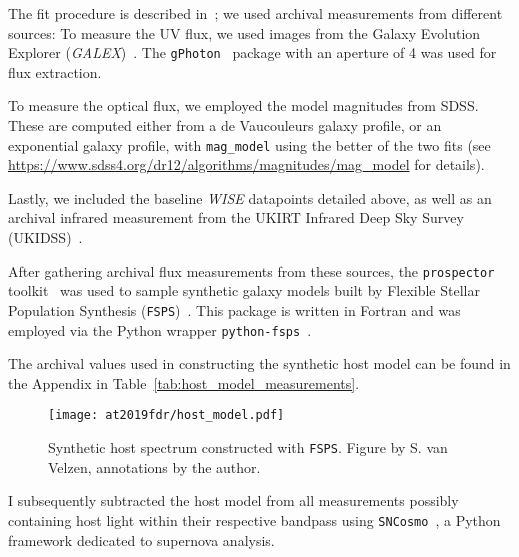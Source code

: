 The fit procedure is described in~; we used archival measurements from different sources: To measure the UV flux, we used images from the Galaxy Evolution Explorer (\textit{GALEX})~. The \texttt{gPhoton}~ package with an aperture of \SI{4}{\arcsec} was used for flux extraction.

To measure the optical flux, we employed the model magnitudes from SDSS. These are computed either from a de Vaucouleurs galaxy profile, or an exponential galaxy profile, with \texttt{mag\_model} using the better of the two fits (see \url{https://www.sdss4.org/dr12/algorithms/magnitudes/mag_model} for details).

Lastly, we included the baseline \textit{WISE} datapoints detailed above, as well as an archival infrared measurement from the UKIRT Infrared Deep Sky Survey (UKIDSS)~.

\pagebreak

After gathering archival flux measurements from these sources, the \texttt{prospector} toolkit~ was used to sample synthetic galaxy models built by Flexible Stellar Population Synthesis (\texttt{FSPS})~. This package is written in Fortran and was employed via the Python wrapper \texttt{python-fsps}~.

The archival values used in constructing the synthetic host model can be found in the Appendix in Table~\ref{tab:host_model_measurements}.

\begin{figure}[htb]
    \texttt{[image: at2019fdr/host\_model.pdf]}
    \caption[Synthetic host spectrum]{Synthetic host spectrum constructed with \texttt{FSPS}. Figure by S. van Velzen, annotations by the author.}
\end{figure}

I subsequently subtracted the host model from all measurements possibly containing host light within their respective bandpass using \texttt{SNCosmo}~, a Python framework dedicated to supernova analysis.

